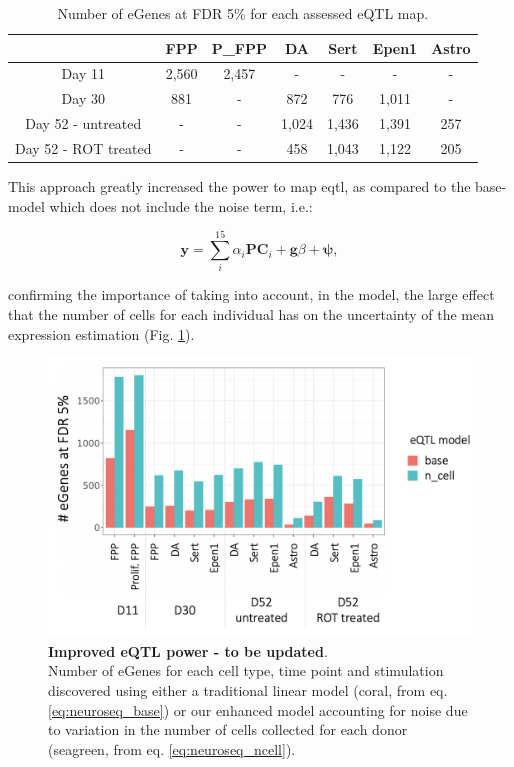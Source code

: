 \begin{table}[h]
    \centering
    \begin{tabular}{c|c c c c c c}
    &         FPP & P\_FPP & DA & Sert & Epen1 & Astro \\
    \hline
    Day 11  & 2,560 & 2,457 & - & - & - & - \\
    Day 30  & 881 & - &  872 & 776 & 1,011 & -  \\
    Day 52 - untreated & - & - & 1,024 & 1,436 & 1,391 & 257 \\
    Day 52 - ROT treated & - & -  & 458 & 1,043 & 1,122 & 205 \\
    \end{tabular}
    \caption{Number of eGenes at FDR 5\% for each assessed eQTL map.}
    \label{tab:eqtl_results}
\end{table}


This approach greatly increased the power to map \gls{eqtl},
as compared to the base-model which does not include the noise term, i.e.:

\begin{equation}\label{eq:neuroseq_base}
    \mathbf{y} = \sum_i^{15}\alpha_i \mathbf{PC}_i + \mathbf{g}\beta + \boldsymbol{\psi},
\end{equation}

confirming the importance of taking into account, in the model, the large effect that the number of cells for each individual has on the 
uncertainty
of the mean expression estimation (Fig. \ref{fig:neuroseq_eqtl_improved_power}).



\begin{figure}[h]
\centering
\includegraphics[width=13cm]{Chapter5/Fig/neuroseq_eqtl_power.png}
\caption[Improved eQTL power]{\textbf{Improved eQTL power - to be updated}.\\
Number of eGenes for each cell type, time point and stimulation discovered using either a traditional linear model (coral, from eq. \eqref{eq:neuroseq_base}) or our enhanced model accounting for noise due to variation in the number of cells collected for each donor (seagreen, from eq. \eqref{eq:neuroseq_ncell}).}
\label{fig:neuroseq_eqtl_improved_power}
\end{figure}


